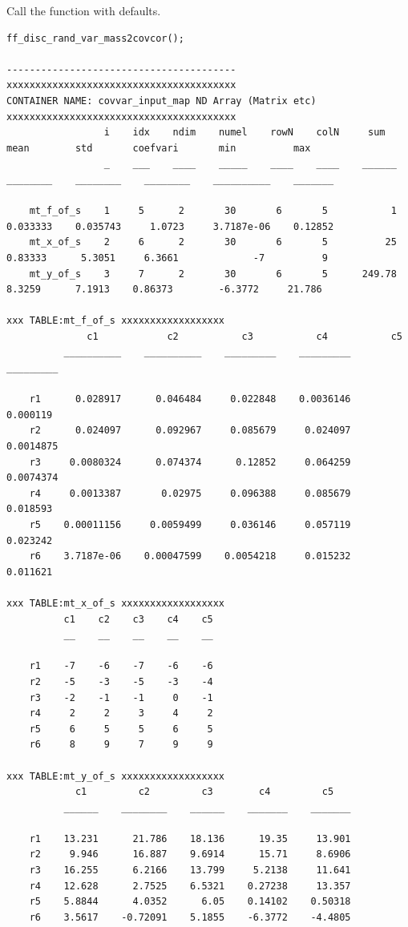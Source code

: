 \documentclass[
]{book}
\begin{document}
Call the function with defaults.

\begin{verbatim}
ff_disc_rand_var_mass2covcor();

----------------------------------------
xxxxxxxxxxxxxxxxxxxxxxxxxxxxxxxxxxxxxxxx
CONTAINER NAME: covvar_input_map ND Array (Matrix etc)
xxxxxxxxxxxxxxxxxxxxxxxxxxxxxxxxxxxxxxxx
                 i    idx    ndim    numel    rowN    colN     sum        mean        std       coefvari       min          max  
                 _    ___    ____    _____    ____    ____    ______    ________    ________    ________    __________    _______

    mt_f_of_s    1     5      2       30       6       5           1    0.033333    0.035743     1.0723     3.7187e-06    0.12852
    mt_x_of_s    2     6      2       30       6       5          25     0.83333      5.3051     6.3661             -7          9
    mt_y_of_s    3     7      2       30       6       5      249.78      8.3259      7.1913    0.86373        -6.3772     21.786

xxx TABLE:mt_f_of_s xxxxxxxxxxxxxxxxxx
              c1            c2           c3           c4           c5    
          __________    __________    _________    _________    _________

    r1      0.028917      0.046484     0.022848    0.0036146     0.000119
    r2      0.024097      0.092967     0.085679     0.024097    0.0014875
    r3     0.0080324      0.074374      0.12852     0.064259    0.0074374
    r4     0.0013387       0.02975     0.096388     0.085679     0.018593
    r5    0.00011156     0.0059499     0.036146     0.057119     0.023242
    r6    3.7187e-06    0.00047599    0.0054218     0.015232     0.011621

xxx TABLE:mt_x_of_s xxxxxxxxxxxxxxxxxx
          c1    c2    c3    c4    c5
          __    __    __    __    __

    r1    -7    -6    -7    -6    -6
    r2    -5    -3    -5    -3    -4
    r3    -2    -1    -1     0    -1
    r4     2     2     3     4     2
    r5     6     5     5     6     5
    r6     8     9     7     9     9

xxx TABLE:mt_y_of_s xxxxxxxxxxxxxxxxxx
            c1         c2         c3        c4         c5   
          ______    ________    ______    _______    _______

    r1    13.231      21.786    18.136      19.35     13.901
    r2     9.946      16.887    9.6914      15.71     8.6906
    r3    16.255      6.2166    13.799     5.2138     11.641
    r4    12.628      2.7525    6.5321    0.27238     13.357
    r5    5.8844      4.0352      6.05    0.14102    0.50318
    r6    3.5617    -0.72091    5.1855    -6.3772    -4.4805


\end{verbatim}
\end{document}
